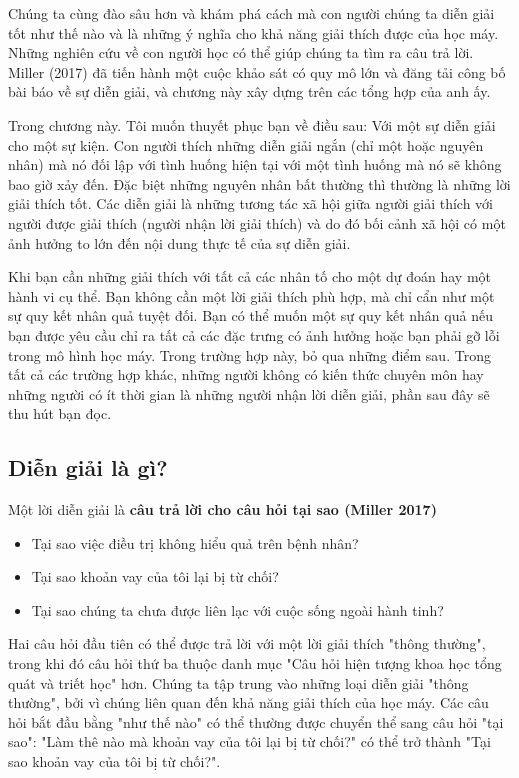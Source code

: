 Chúng ta cùng đào sâu hơn và khám phá cách mà con người chúng ta diễn giải tốt như thế nào và là những ý nghĩa cho khả năng giải thích được của học máy. Những nghiên cứu về con người học có thể giúp chúng ta tìm ra câu trả lời. Miller (2017) đã tiến hành một cuộc khảo sát có quy mô lớn và đăng tải công bố bài báo về sự diễn giải, và chương này xây dựng trên các tổng hợp của anh ấy.

Trong chương này. Tôi muốn thuyết phục bạn về điều sau: Với một sự diễn giải cho một sự kiện. Con người thích những diễn giải ngắn (chỉ một hoặc nguyên nhân) mà nó đối lập với tình huống hiện tại với một tình huống mà nó sẽ không bao giờ xảy đến. Đặc biệt những nguyên nhân bất thường thì thường là những lời giải thích tốt. Các diễn giải là những tương tác xã hội giữa người giải thích với người được giải thích (người nhận lời giải thích) và do đó bối cảnh xã hội có một ảnh hưởng to lớn đến nội dung thực tế của sự diễn giải.

Khi bạn cần những giải thích với tất cả các nhân tố cho một dự đoán hay một hành vi cụ thể. Bạn không cần một lời giải thích phù hợp, mà chỉ cẩn như một sự quy kết nhân quả tuyệt đối. Bạn có thể muốn một sự quy kết nhân quả nếu bạn được yêu cầu chỉ ra tất cả các đặc trưng có ảnh hưởng hoặc bạn phải gỡ lỗi trong mô hình học máy. Trong trường hợp này, bỏ qua những điểm sau. Trong tất cả các trường hợp khác, những người không có kiến thức chuyên môn hay những người có ít thời gian là những người nhận lời diễn giải, phần sau đây sẽ thu hút bạn đọc.

\subsection{Diễn giải là gì?}
Một lời diễn giải là \textbf{câu trả lời cho câu hỏi tại sao (Miller 2017)}

\begin{itemize}
\item  Tại sao việc điều trị không hiểu quả trên bệnh nhân?
\item  Tại sao khoản vay của tôi lại bị từ chối?
\item  Tại sao chúng ta chưa được liên lạc với cuộc sống ngoài hành tinh?
\end{itemize}

Hai câu hỏi đầu tiên có thể được trả lời với một lời giải thích "thông thường", trong khi đó câu hỏi thứ ba thuộc danh mục "Câu hỏi hiện tượng khoa học tổng quát và triết học" hơn. Chúng ta tập trung vào những loại diễn giải "thông thường", bởi vì chúng liên quan đến khả năng giải thích của học máy. Các câu hỏi bắt đầu bằng "như thế nào" có thể thường được chuyển thể sang câu hỏi "tại sao": "Làm thê nào mà khoản vay của tôi lại bị từ chối?" có thể trở thành "Tại sao khoản vay của tôi bị từ chối?".

